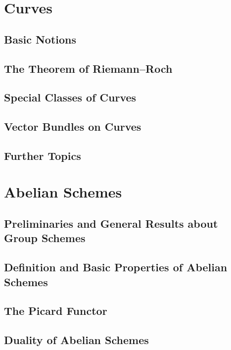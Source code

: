 \documentclass[11pt, a4paper]{article}
\begin{document}
\section{Curves}

\subsection{Basic Notions}

\subsection{The Theorem of Riemann--Roch}

\subsection{Special Classes of Curves}

\subsection{Vector Bundles on Curves}

\subsection{Further Topics}

\section{Abelian Schemes}

\subsection{Preliminaries and General Results about Group Schemes}

\subsection{Definition and Basic Properties of Abelian Schemes}

\subsection{The Picard Functor}

\subsection{Duality of Abelian Schemes}
\end{document}

